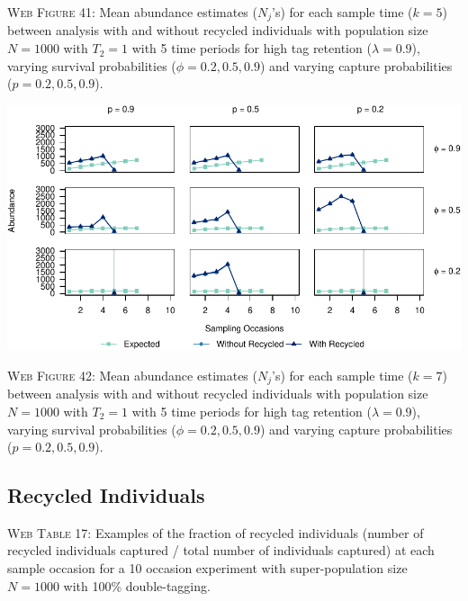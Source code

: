 \documentclass[]{article}
\begin{document}
\textsc{Web Figure 41:} Mean abundance estimates (\(N_j\)'s) for each
sample time (\(k=5\)) between analysis with and without recycled
individuals with population size \(N=1000\) with \(T_2=1\) with 5 time
periods for high tag retention (\(\lambda=0.9\)), varying survival
probabilities (\(\phi=0.2,0.5,0.9\)) and varying capture probabilities
(\(p=0.2,0.5,0.9\)).

\includegraphics{Appendix_files/figure-latex/42_abundance_H_GJSTL6-1.pdf}

\textsc{Web Figure 42:} Mean abundance estimates (\(N_j\)'s) for each
sample time (\(k=7\)) between analysis with and without recycled
individuals with population size \(N=1000\) with \(T_2=1\) with 5 time
periods for high tag retention (\(\lambda=0.9\)), varying survival
probabilities (\(\phi=0.2,0.5,0.9\)) and varying capture probabilities
(\(p=0.2,0.5,0.9\)).

\newpage

\subsection{Recycled Individuals}\label{recycled-individuals}

\textsc{Web Table 17:} Examples of the fraction of recycled individuals
(number of recycled individuals captured / total number of individuals
captured) at each sample occasion for a 10 occasion experiment with
super-population size \(N=1000\) with 100\% double-tagging.
\end{document}
